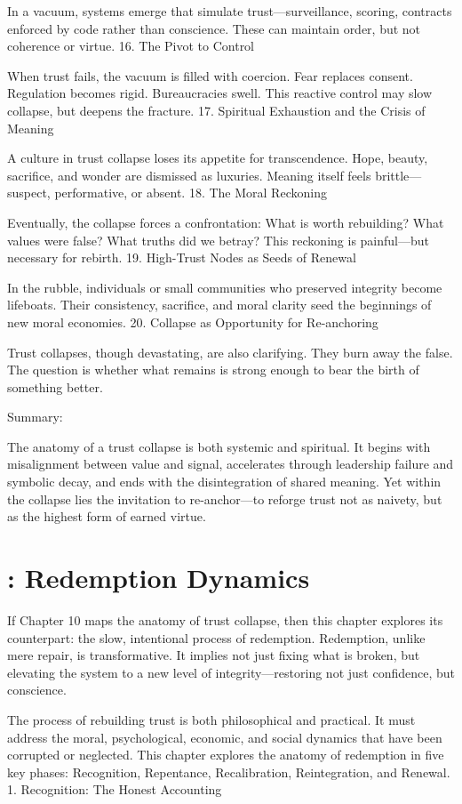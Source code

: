 \documentclass[11pt,oneside]{book}
\begin{document}
In a vacuum, systems emerge that simulate trust—surveillance, scoring, contracts enforced by code rather than conscience. These can maintain order, but not coherence or virtue.
16. The Pivot to Control

When trust fails, the vacuum is filled with coercion. Fear replaces consent. Regulation becomes rigid. Bureaucracies swell. This reactive control may slow collapse, but deepens the fracture.
17. Spiritual Exhaustion and the Crisis of Meaning

A culture in trust collapse loses its appetite for transcendence. Hope, beauty, sacrifice, and wonder are dismissed as luxuries. Meaning itself feels brittle—suspect, performative, or absent.
18. The Moral Reckoning

Eventually, the collapse forces a confrontation: What is worth rebuilding? What values were false? What truths did we betray? This reckoning is painful—but necessary for rebirth.
19. High-Trust Nodes as Seeds of Renewal

In the rubble, individuals or small communities who preserved integrity become lifeboats. Their consistency, sacrifice, and moral clarity seed the beginnings of new moral economies.
20. Collapse as Opportunity for Re-anchoring

Trust collapses, though devastating, are also clarifying. They burn away the false. The question is whether what remains is strong enough to bear the birth of something better.

Summary:

The anatomy of a trust collapse is both systemic and spiritual. It begins with misalignment between value and signal, accelerates through leadership failure and symbolic decay, and ends with the disintegration of shared meaning. Yet within the collapse lies the invitation to re-anchor—to reforge trust not as naivety, but as the highest form of earned virtue.


\chapter{: Redemption Dynamics}

If Chapter 10 maps the anatomy of trust collapse, then this chapter explores its counterpart: the slow, intentional process of redemption. Redemption, unlike mere repair, is transformative. It implies not just fixing what is broken, but elevating the system to a new level of integrity—restoring not just confidence, but conscience.

The process of rebuilding trust is both philosophical and practical. It must address the moral, psychological, economic, and social dynamics that have been corrupted or neglected. This chapter explores the anatomy of redemption in five key phases: Recognition, Repentance, Recalibration, Reintegration, and Renewal.
1. Recognition: The Honest Accounting
\end{document}
